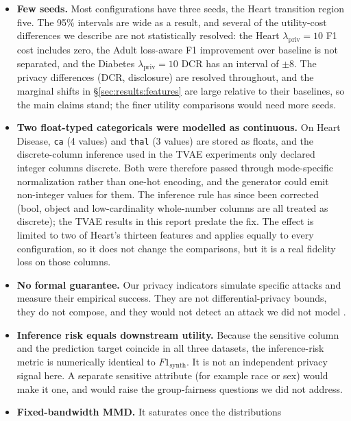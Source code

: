 \documentclass[11pt,a4paper]{article}
\newcommand{\lpriv}{\lambda_{\text{priv}}}
\begin{document}
\begin{itemize}[nosep]
  \item \textbf{Few seeds.} Most configurations have three seeds, the Heart
        transition region five. The 95\% intervals are wide as a result, and
        several of the utility-cost differences we describe are not
        statistically resolved: the Heart $\lpriv = 10$ F1 cost includes zero,
        the Adult loss-aware F1 improvement over baseline is not separated,
        and the Diabetes $\lpriv = 10$ DCR has an interval of $\pm 8$. The
        privacy differences (DCR, disclosure) are resolved throughout, and the
        marginal shifts in \S\ref{sec:results:features} are large relative to
        their baselines, so the main claims stand; the finer utility
        comparisons would need more seeds.
  \item \textbf{Two float-typed categoricals were modelled as continuous.}
        On Heart Disease, \texttt{ca} (4 values) and \texttt{thal} (3 values)
        are stored as floats, and the discrete-column inference used in the
        TVAE experiments only declared integer columns discrete. Both were
        therefore passed through mode-specific normalization rather than
        one-hot encoding, and the generator could emit non-integer values for
        them. The inference rule has since been corrected (bool, object and
        low-cardinality whole-number columns are all treated as discrete); the
        TVAE results in this report predate the fix. The effect is limited to
        two of Heart's thirteen features and applies equally to every
        configuration, so it does not change the comparisons, but it is a
        real fidelity loss on those columns.
  \item \textbf{No formal guarantee.} Our privacy indicators simulate specific
        attacks and measure their empirical success. They are not
        differential-privacy bounds, they do not compose, and they would not
        detect an attack we did not model \citep{stadler2022groundhog}.
  \item \textbf{Inference risk equals downstream utility.} Because the
        sensitive column and the prediction target coincide in all three
        datasets, the inference-risk metric is numerically identical to
        $F1_{\text{synth}}$. It is not an independent privacy signal here. A
        separate sensitive attribute (for example race or sex) would make it
        one, and would raise the group-fairness questions we did not address.
  \item \textbf{Fixed-bandwidth MMD.} It saturates once the distributions

\end{itemize}
\end{document}
